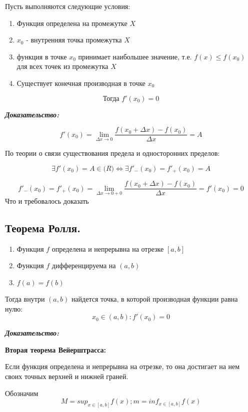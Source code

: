 \documentclass[a4paper,12pt]{article}
\theoremstyle{plain} %
\theoremstyle{definition} %
\theoremstyle{remark} %
\begin{document}
Пусть выполняются следующие условия:

\begin{enumerate}
	\item Функция определена на промежутке $X$
	\item $x_0$ - внутренняя точка промежутка $X$
	\item функция в точке $x_0$ принимает наибольшее значение, т.е. $f(x) \leq f(x_0)$ для всех точек из промежутка $X$
	\item Существует конечная производная в точке $x_0$
\end{enumerate}
\[ \textbf{Тогда } f'(x_0) = 0 \]

\textit{\textbf{Доказательство:}}

\[
	f'(x_0) = \lim_{\Delta x \rightarrow 0} \frac{f(x_0 + \Delta x) - f(x_0)}{\Delta x} = A
\]

По теории о связи существования предела и односторонних пределов:

\[
	\exists f'(x_0) = A \in \mathbf(R) \Leftrightarrow \exists f'_-(x_0) = f'_+(x_0) = A
\]

\[
	f'_-(x_0) = f'_+(x_0) = \lim_{\Delta x \rightarrow 0 + 0} \frac{f(x_0 + \Delta x) - f(x_0)}{\Delta x} = f'(x_0) = 0
\]
Что и требовалось доказать


\newpage
{}
\subsection*{Теорема Ролля.                                                                             }

\begin{enumerate}
	\item Функция $f$ определена и непрерывна на отрезке $[a, b]$
	\item Функция $f$ дифференцируема на $(a, b)$
	\item $f(a) = f(b)$
\end{enumerate}

Тогда внутри $(a, b)$ найдется точка, в которой производная функции равна нулю:
\[
	x_0 \in (a, b): f'(x_0) = 0
\]

\textit{\textbf{Доказательство:}}

\textbf{Вторая теорема Вейерштрасса:}

Если функция определена и непрерывна на отрезке, то она достигает на нем своих точных верхней и нижней граней.

Обозначим
\[ M = sup_{x \in [a, b]}f(x); m = inf_{x \in [a, b]} f(x) \]
\end{document}
